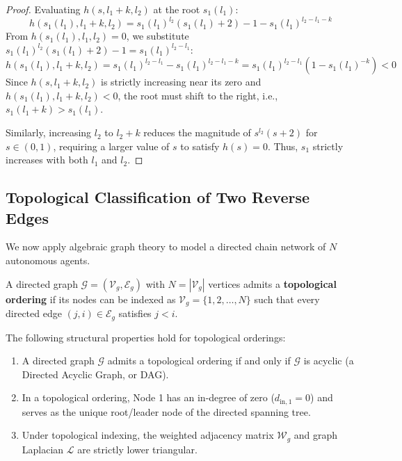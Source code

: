 \begin{proof}
Evaluating $h(s, l_1+k, l_2)$ at the root $s_1(l_1)$:
\begin{equation}
	h(s_1(l_1), l_1+k, l_2) = s_1(l_1)^{l_2}(s_1(l_1)+2) - 1 - s_1(l_1)^{l_2-l_1-k}
\end{equation}
From $h(s_1(l_1), l_1, l_2) = 0$, we substitute $s_1(l_1)^{l_2}(s_1(l_1)+2) - 1 = s_1(l_1)^{l_2-l_1}$:
\begin{equation}
	h(s_1(l_1), l_1+k, l_2) = s_1(l_1)^{l_2-l_1} - s_1(l_1)^{l_2-l_1-k} = s_1(l_1)^{l_2-l_1} \left( 1 - s_1(l_1)^{-k} \right) < 0
\end{equation}
Since $h(s, l_1+k, l_2)$ is strictly increasing near its zero and $h(s_1(l_1), l_1+k, l_2) < 0$, the root must shift to the right, i.e., $s_1(l_1+k) > s_1(l_1)$.

Similarly, increasing $l_2$ to $l_2 + k$ reduces the magnitude of $s^{l_2}(s+2)$ for $s \in (0,1)$, requiring a larger value of $s$ to satisfy $h(s) = 0$. Thus, $s_1$ strictly increases with both $l_1$ and $l_2$.
\end{proof}


\subsection{Topological Classification of Two Reverse Edges}
We now apply algebraic graph theory to model a directed chain network of $N$ autonomous agents.

\begin{definition}\label{def:ch_TRE_chaindigraph}
\leavevmode\par\noindent
A directed graph $\mathcal{G} = (\mathcal{V}_g, \mathcal{E}_g)$ with $N = |\mathcal{V}_g|$ vertices admits a \textbf{topological ordering} if its nodes can be indexed as $\mathcal{V}_g = \{1, 2, \dots, N\}$ such that every directed edge $(j, i) \in \mathcal{E}_g$ satisfies $j < i$.
\end{definition}
\begin{remark}\label{rem:ch_TRE_topologicalproperties}
The following structural properties hold for topological orderings:
\begin{enumerate}
	\item A directed graph $\mathcal{G}$ admits a topological ordering if and only if $\mathcal{G}$ is acyclic (a Directed Acyclic Graph, or DAG).
	\item In a topological ordering, Node 1 has an in-degree of zero ($d_{\text{in}, 1} = 0$) and serves as the unique root/leader node of the directed spanning tree.
	\item Under topological indexing, the weighted adjacency matrix $\mathcal{W}_g$ and graph Laplacian $\mathcal{L}$ are strictly lower triangular.
\end{enumerate}
\end{remark}

